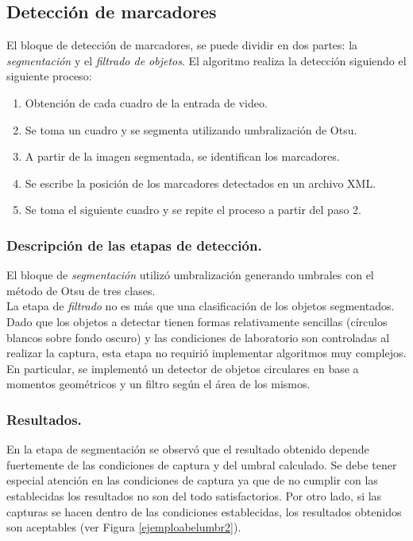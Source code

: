 \subsection{Detección de marcadores}
El bloque de detección de marcadores, se puede dividir en dos partes: la \textit{segmentación} y el \textit{filtrado de objetos}.
%
El algoritmo realiza la detección siguiendo el siguiente proceso:
%
\begin{enumerate}
  \item Obtención de cada cuadro de la entrada de video.
  \item Se toma un cuadro y se segmenta utilizando umbralización de Otsu.
  \item A partir de la imagen segmentada, se identifican los marcadores.
  \item Se escribe la posición de los marcadores detectados en un archivo XML.
  \item Se toma el siguiente cuadro y se repite el proceso a partir del paso 2.
\end{enumerate}
%
\subsubsection{Descripción de las etapas de detección.}
El bloque de \textit{segmentación} utilizó umbralización generando umbrales con el método de Otsu\cite{otsu} de tres clases.\\
%
La etapa de \textit{filtrado} no es más que una clasificación de los objetos segmentados. Dado que los objetos a detectar tienen formas relativamente sencillas (círculos blancos sobre fondo oscuro) y las condiciones de laboratorio son controladas al realizar la captura, esta etapa no requirió implementar algoritmos muy complejos. En particular, se implementó un detector de objetos circulares en base a momentos geométricos\cite{imageMoments} y un filtro según el área de los mismos.
%
\subsubsection{Resultados.}
En la etapa de segmentación se observó que el resultado obtenido depende fuertemente de las condiciones de captura y del umbral calculado. Se debe tener especial atención en las condiciones de captura ya que de no cumplir con las establecidas los resultados no son del todo satisfactorios. Por otro lado, si las capturas se hacen dentro de las condiciones establecidas, los resultados obtenidos son aceptables (ver Figura \ref{ejemploabelumbr2}).


